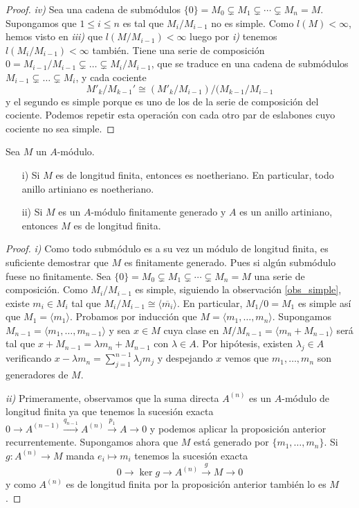 \documentclass[../main.tex]{subfiles}
\begin{document}
\begin{proof}
\textit{iv)} Sea una cadena de submódulos $\{0\}=M_0\subsetneq M_1\subsetneq\cdots\subsetneq M_n=M$. Supongamos que $1 \leq i \leq n$ es tal que $M_i/M_{i-1}$ no es simple. Como $l(M) < \infty$, hemos visto en \textit{iii)} que $l(M/M_{i-1})< \infty$ luego por \textit{i)} tenemos $l(M_i/M_{i-1})< \infty$ también.
Tiene una serie de composición $0 = M_{i-1}/M_{i-1} \subsetneq \dots \subsetneq M_i/M_{i-1}$, que se traduce en una cadena de submódulos $M_{i-1} \subsetneq \dots \subsetneq M_i$, y cada cociente
$$M'_k/M_{k-1}' \cong (M'_k / M_{i-1}) / (M_{k-1}/M_{i-1}$$
y el segundo es simple porque es uno de los de la serie de composición del cociente. Podemos repetir esta operación con cada otro par de eslabones cuyo cociente no sea simple.

\end{proof}

\begin{corollary}\label{finit_gen_length}Sea $M$ un $A$-módulo.
\begin{itemize}
    \item[i)] Si $M$ es de longitud finita, entonces es noetheriano. En particular, todo anillo artiniano es noetheriano.
    \item[ii)] Si $M$ es un $A$-módulo finitamente generado y $A$ es un anillo artiniano, entonces $M$ es de longitud finita.
\end{itemize}
\end{corollary}
\begin{proof}
\textit{i)} Como todo submódulo es a su vez un módulo de longitud finita, es suficiente demostrar que $M$ es finitamente generado. Pues si algún submódulo fuese no finitamente. Sea $\{0\}=M_0\subsetneq M_1\subsetneq\cdots\subsetneq M_n=M$ una serie de composición. Como $M_i/M_{i-1}$ es simple, siguiendo la observación \ref{obs_simple}, existe $m_i\in M_i$ tal que  $M_i/M_{i-1}\cong \langle\overline{m_i}\rangle$.
En particular, $M_1/0 = M_1$ es simple así que $M_1 = \langle m_1 \rangle$. Probamos por inducción que $M=\langle m_1,\dots,m_n\rangle$.
Supongamos $M_{n-1}=\langle m_1,\dots,m_{n-1}\rangle$ y sea $x\in M$ cuya clase en $M/M_{n-1} = \langle m_n + M_{n-1}\rangle$ será tal que $x+M_{n-1}=\lambda m_n+ M_{n-1}$ con $\lambda\in A$. Por hipótesis, existen $\lambda_j\in A$ verificando $x-\lambda m_n=\sum_{j=1}^{n-1}\lambda_j m_j$ y despejando $x$ vemos que $m_1, \dots, m_n$ son generadores de $M$.

\textit{ii)} Primeramente, observamos que la suma directa $A^{(n)}$ es un $A$-módulo de longitud finita ya que tenemos la sucesión exacta $0\rightarrow A^{(n-1)}\overset{q_{n-1}}{\rightarrow}A^{(n)}\overset{p_1}{\rightarrow}A\rightarrow 0$ y podemos aplicar la proposición anterior recurrentemente. Supongamos ahora que $M$ está generado por $\{m_1,\dots,m_n\}$. Si $g:A^{(n)} \to M$ manda $e_i \mapsto m_i$ tenemos la sucesión exacta
$$0\rightarrow\ker g\rightarrow A^{(n)} \overset{g}{\rightarrow}M\rightarrow 0$$
y como $A^{(n)}$ es de longitud finita por la proposición anterior también lo es $M$.
\end{proof}
\end{document}
